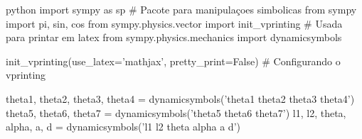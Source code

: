 \begin{mintedbox}{python}
import sympy as sp    # Pacote para manipulaçoes simbolicas
from sympy import pi, sin, cos
from sympy.physics.vector import init_vprinting   # Usada para printar em latex
from sympy.physics.mechanics import dynamicsymbols

init_vprinting(use_latex='mathjax', pretty_print=False)   # Configurando o vprinting

theta1, theta2, theta3, theta4 = dynamicsymbols('theta1 theta2 theta3 theta4')
theta5, theta6, theta7 = dynamicsymbols('theta5 theta6 theta7')
l1, l2, theta, alpha, a, d = dynamicsymbols('l1 l2 theta alpha a d')
\end{mintedbox}